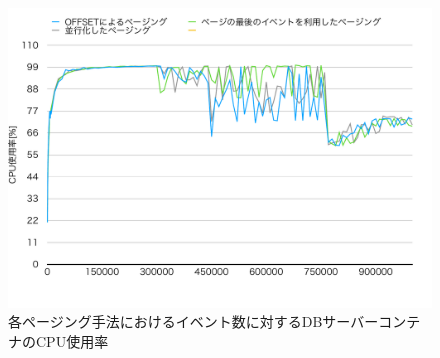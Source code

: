 \documentclass[../../../../../main]{subfiles}
\begin{document}
    \begin{figure}[H]
        \centering
        \includegraphics[width=12cm]{graph}
        \caption{各ページング手法におけるイベント数に対するDBサーバーコンテナのCPU使用率}
        \label{fig:each-paging-db-cpu-app_1_1024-db_1_1024}
    \end{figure}
\end{document}
